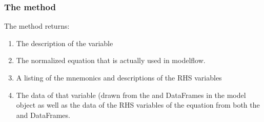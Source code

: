 \documentclass[letterpaper,10pt,english]{jupyterBook}
\begin{document}
\subsubsection{The  method}
\label{\detokenize{content/05_WBModels/LoadingWBModel:the-show-method}}
\sphinxAtStartPar
The  method returns:
\begin{enumerate}
%
\item {} 
\sphinxAtStartPar
The description of the variable

\item {} 
\sphinxAtStartPar
The normalized equation that is actually used in modelflow.

\item {} 
\sphinxAtStartPar
A listing of the mnemonics and descriptions of the RHS variables

\item {} 
\sphinxAtStartPar
The data of that variable (drawn from the  and  DataFrames in the model object as well as the data of the RHS variables of the equation from both the  and  DataFrames.

\end{enumerate}
\end{document}
